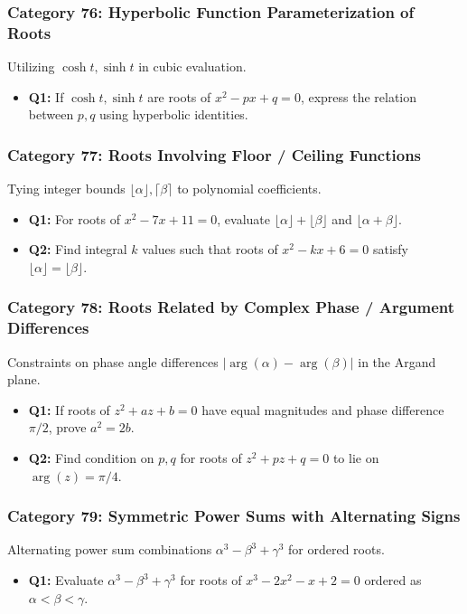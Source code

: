\documentclass[10pt,a4paper]{article}
\begin{document}
\subsubsection{Category 76: Hyperbolic Function Parameterization of Roots}
Utilizing $\cosh t, \sinh t$ in cubic evaluation.
\begin{itemize}[leftmargin=*]
    \item \textbf{Q1:} If $\cosh t, \sinh t$ are roots of $x^2 - px + q = 0$, express the relation between $p, q$ using hyperbolic identities.
\end{itemize}

\subsubsection{Category 77: Roots Involving Floor / Ceiling Functions}
Tying integer bounds $\lfloor \alpha \rfloor, \lceil \beta \rceil$ to polynomial coefficients.
\begin{itemize}[leftmargin=*]
    \item \textbf{Q1:} For roots of $x^2 - 7x + 11 = 0$, evaluate $\lfloor \alpha \rfloor + \lfloor \beta \rfloor$ and $\lfloor \alpha+\beta \rfloor$.
    \item \textbf{Q2:} Find integral $k$ values such that roots of $x^2 - kx + 6 = 0$ satisfy $\lfloor \alpha \rfloor = \lfloor \beta \rfloor$.
\end{itemize}

\subsubsection{Category 78: Roots Related by Complex Phase / Argument Differences}
Constraints on phase angle differences $|\arg(\alpha) - \arg(\beta)|$ in the Argand plane.
\begin{itemize}[leftmargin=*]
    \item \textbf{Q1:} If roots of $z^2 + az + b = 0$ have equal magnitudes and phase difference $\pi/2$, prove $a^2 = 2b$.
    \item \textbf{Q2:} Find condition on $p, q$ for roots of $z^2 + pz + q = 0$ to lie on $\arg(z) = \pi/4$.
\end{itemize}

\subsubsection{Category 79: Symmetric Power Sums with Alternating Signs}
Alternating power sum combinations $\alpha^3 - \beta^3 + \gamma^3$ for ordered roots.
\begin{itemize}[leftmargin=*]
    \item \textbf{Q1:} Evaluate $\alpha^3 - \beta^3 + \gamma^3$ for roots of $x^3 - 2x^2 - x + 2 = 0$ ordered as $\alpha < \beta < \gamma$.
\end{itemize}
\end{document}
